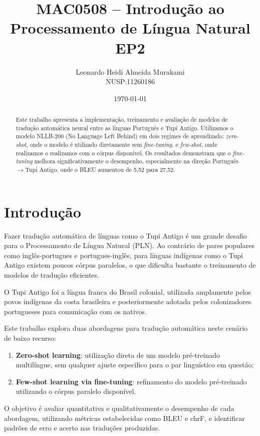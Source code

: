 \documentclass[12pt,a4paper]{article}
\title{MAC0508 -- Introdução ao Processamento de Língua Natural\\
\vspace{0.5cm}
\Large EP2}
\author{Leonardo Heidi Almeida Murakami \\ NUSP:11260186}
\date{\today}
\begin{document}
\maketitle

\begin{abstract}
Este trabalho apresenta a implementação, treinamento e avaliação de modelos de tradução automática neural entre as línguas Português e Tupi Antigo. Utilizamos o modelo NLLB-200 (No Language Left Behind) em dois regimes de aprendizado: \textit{zero-shot}, onde o modelo é utilizado diretamente sem \textit{fine-tuning}, e \textit{few-shot}, onde realizamos o realizamos com o córpus disponível. Os resultados demonstram que o \textit{fine-tuning} melhora significativamente o desempenho, especialmente na direção Português$\rightarrow$Tupi Antigo, onde o BLEU aumentou de 5,52 para 27,52.
\end{abstract}

\section{Introdução}

Fazer tradução automática de línguas como o Tupi Antigo é um grande desafio para o Processamento de Língua Natural (PLN). Ao contrário de pares populares como inglês-portugues e portugues-inglês, para línguas indígenas como o Tupi Antigo existem poucos córpus paralelos, o que dificulta bastante o treinamento de modelos de tradução eficientes.

O Tupi Antigo foi a língua franca do Brasil colonial, utilizada amplamente pelos povos indígenas da costa brasileira e posteriormente adotada pelos colonizadores portugueses para comunicação com os nativos.

Este trabalho explora duas abordagens para tradução automática neste cenário de baixo recurso:

\begin{enumerate}
    \item \textbf{Zero-shot learning}: utilização direta de um modelo pré-treinado multilíngue, sem qualquer ajuste específico para o par linguístico em questão;
    \item \textbf{Few-shot learning via fine-tuning}: refinamento do modelo pré-treinado utilizando o córpus paralelo disponível.
\end{enumerate}

O objetivo é avaliar quantitativa e qualitativamente o desempenho de cada abordagem, utilizando métricas estabelecidas como BLEU e chrF, e identificar padrões de erro e acerto nas traduções produzidas.
\end{document}
